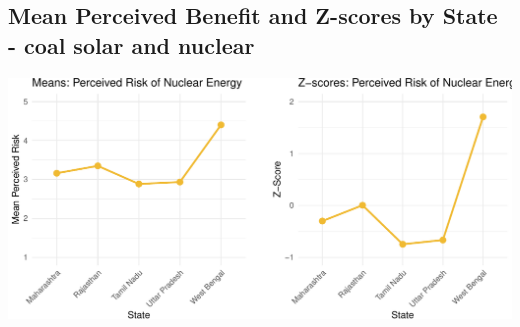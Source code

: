 \documentclass[
]{article}
\begin{document}
\newpage

\hypertarget{mean-perceived-benefit-and-z-scores-by-state---coal-solar-and-nuclear}{%
\subsection{Mean Perceived Benefit and Z-scores by State - coal solar
and
nuclear}\label{mean-perceived-benefit-and-z-scores-by-state---coal-solar-and-nuclear}}

\includegraphics{nuclear-in-comparison_files/figure-latex/unnamed-chunk-33-1.pdf}

\newpage
\end{document}
